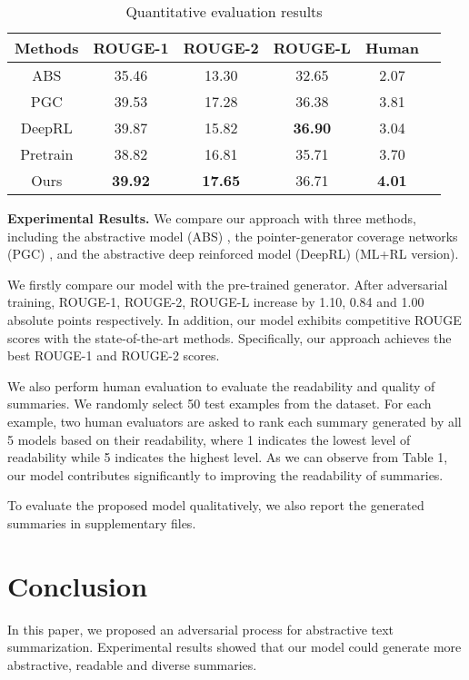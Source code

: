 \documentclass[letterpaper]{article} \usepackage{aaai18}  \usepackage{times}  \usepackage{helvet}  \usepackage{courier}  \usepackage{url}  \usepackage{graphicx}  \frenchspacing  \usepackage{multirow}
\begin{document}
\begin{table}[]
	\footnotesize
	\centering
	\begin{tabular}{|c|c|c|c|c|c|}
		\hline
		Methods & ROUGE-1 & ROUGE-2 & ROUGE-L & Human\\ \hline
		ABS &   35.46   & 13.30 & 32.65  & 2.07\\ \hline
		PGC &   39.53   & 17.28 &  36.38 & 3.81\\ \hline
		DeepRL  &   39.87   & 15.82 &  \textbf{36.90}&3.04\\ \hline
		Pretrain & 38.82 & 16.81 & 35.71 & 3.70 \\ \hline
		Ours   &   \textbf{39.92} & \textbf{17.65} & 36.71 & \textbf{4.01} \\ \hline
	\end{tabular}
	\caption{Quantitative evaluation results}
	\label{my-label}
\end{table}


\textbf{Experimental Results.} We compare our approach with three methods, including the abstractive model (ABS) \cite{nallapati2016abstractive}, the pointer-generator coverage networks (PGC) \cite{see2017get}, and the abstractive deep reinforced model (DeepRL) \cite{paulus2017deep} (ML+RL version).

We firstly compare our model with the pre-trained generator. After adversarial training, ROUGE-1, ROUGE-2, ROUGE-L increase by 1.10, 0.84 and 1.00 absolute points respectively. In addition, our model exhibits competitive ROUGE scores with the state-of-the-art methods. Specifically, our approach achieves the best ROUGE-1 and ROUGE-2 scores. 

We also perform human evaluation to evaluate the readability and quality of summaries. We randomly select 50 test examples from the dataset. For each example, two human evaluators are asked to rank each summary generated by all 5 models based on their readability, where 1 indicates the lowest level of readability while 5 indicates the highest level. As we can observe from Table 1,  our model contributes significantly to improving the readability of summaries.

To evaluate the proposed model qualitatively, we also report the generated summaries in supplementary files.

\section{Conclusion}
In this paper, we proposed an adversarial process for abstractive text summarization. Experimental results showed that our model could generate more abstractive, readable and diverse summaries.




\end{document}
